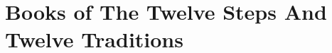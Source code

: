\documentclass[twopage,twocolumn,10pt]{memoir}
\begin{document}
    


    


    
    
    
    

    
    
    
    






    \part*{Books of The Twelve Steps And Twelve Traditions}

    
    
    
\end{document}
